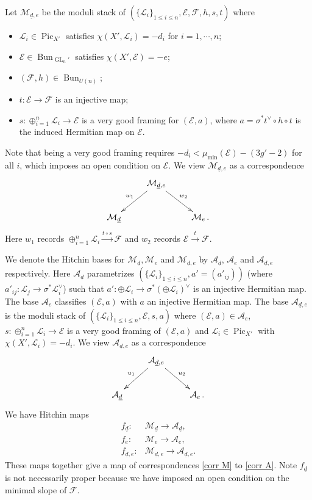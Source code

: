 \documentclass[reqno]{amsart}
\numberwithin{equation}{section}
\DeclareMathOperator{\GL}{GL}
\DeclareMathOperator{\Bun}{Bun}
\DeclareMathOperator{\Pic}{Pic}
\newcommand\un{\underline}
\newcommand\xr{\xrightarrow}
\newcommand\op{\oplus}
\renewcommand\c{\circ}
\newcommand{\s}{\sigma}
\newcommand\cA{\mathcal{A}}
\newcommand\cE{\mathcal{E}}
\newcommand\cF{\mathcal{F}}
\newcommand\cL{\mathcal{L}}
\newcommand\cM{\mathcal{M}}
\theoremstyle{remark}
\numberwithin{equation}{section}
\begin{document}
Let $\cM_{\un d,e}$ be the  moduli stack of $(\{\cL_{i}\}_{1\le i\le n}, \cE, \cF,h,s,t)$ where 
\begin{itemize}
\item $\cL_{i}\in \Pic_{X'}$ satisfies $\chi(X',\cL_{i})=-d_{i}$ for $i=1,\cdots, n$; 
\item $\cE\in \Bun_{\GL_n'}$ satisfies $\chi(X',\cE)=-e$;
\item $(\cF,h)\in \Bun_{U(n)}$; 
\item $t: \cE\to \cF$ is an injective map;
\item $s: \op_{i=1}^{n}\cL_{i}\to\cE$ is a very good framing for $(\cE,a)$, where $a=\s^{*}t^{\vee}\c h\c t$ is the induced Hermitian map on $\cE$.
\end{itemize}
Note that being a very good framing requires $-d_{i}<\mu_{\min}(\cE)-(3g'-2)$ for all $i$, which imposes an open condition on $\cE$.  We view $\cM_{\un d,e}$ as a correspondence
\begin{equation}\label{corr M}
\xymatrix{ & \cM_{\un d, e}\ar[dl]_{w_{1}}\ar[dr]^{w_{2}}\\
\cM_{\un d} & &\cM_{e}\,.}
\end{equation}
Here $w_{1}$ records $\op_{i=1}^{n}\cL_{i}\xr{t\circ s}\cF$ and $w_{2}$ records $\cE\xr{t}\cF$.

We denote the Hitchin bases for $\cM_{\un d}, \cM_{e}$ and $\cM_{\un d,e}$ by $\cA_{\un d}$,  $\cA_{e}$ and $\cA_{\un d,e}$ respectively. Here $\cA_{\un d}$ parametrizes $(\{\cL_{i}\}_{1\le i\le n},a'=(a'_{ij}))$ (where $a'_{ij}: \cL_{j}\to \s^{*}\cL_{i}^{\vee}$) such that $a':\op\cL_{i}\to \s^{*}(\op\cL_{i})^{\vee}$ is an injective Hermitian map.  The base $\cA_{e}$ classifies $(\cE, a)$ with $a$ an injective Hermitian map. The base $\cA_{\un d,e}$ is the moduli stack of $(\{\cL_{i}\}_{1\le i\le n}, \cE, s,a)$ where  $(\cE,a)\in \cA_{e}$, $s: \op_{i=1}^{n}\cL_{i}\to\cE$ is a very good framing of $(\cE,a)$ and $\cL_{i}\in \Pic_{X'}$ with $\chi(X',\cL_{i})=-d_{i}$.  We view $\cA_{\un d,e}$ as a correspondence 
\begin{equation}\label{corr A}
\xymatrix{ & \cA_{\un d, e}\ar[dl]_{u_{1}}\ar[dr]^{u_{2}}\\
\cA_{\un d} & &\cA_{e}\,.}
\end{equation}
We have Hitchin maps
\begin{eqnarray*}
f_{\un d}: &\cM_{\un d}\to \cA_{\un d},\\
f_{e}: &\cM_{e}\to \cA_{e},\\
f_{\un d, e}: &\cM_{\un d, e}\to \cA_{\un d,e}.
\end{eqnarray*} 
These maps together give a map of correspondences \eqref{corr M} to \eqref{corr A}. Note $f_{\un d}$ is not necessarily proper because we have imposed an open condition on the minimal slope of $\cF$.
\end{document}
